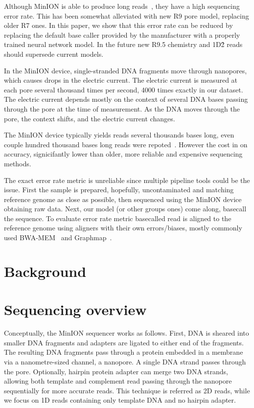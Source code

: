 \documentclass[runningheads,a4paper]{llncs}
\begin{document}
Although MinION is able to produce long reads~\cite{loman1-100k,loman2-800k}, they have a high sequencing error rate. This has been somewhat alleviated with new R9 pore model, replacing older R7 ones. In this paper, we show that this error rate can be reduced by replacing the default base caller provided by the manufacturer with a properly trained neural network model. In the future new R9.5 chemistry and 1D\^2 reads should supersede current models.

In the MinION device, single-stranded DNA fragments move through nanopores, which causes drops in the electric current. The electric current is measured at each pore several thousand times per second, 4000 times exactly in our dataset. The electric current depends mostly on the context of several DNA bases passing through the pore at the time of measurement. As the DNA moves through the pore, the context shifts, and the electric current changes.

The MinION device typically yields reads several thousands bases long, even couple hundred thousand bases long reads were repoted~\cite{loman1-100k,loman2-800k}. However the cost in on accuracy, signicifantly lower than older, more reliable and expensive sequencing methods.

The exact error rate metric is unreliable since multiple pipeline tools could be the issue. First the sample is prepared, hopefully, uncontaminated and matching reference genome as close as possible, then sequenced using the MinION device obtaining raw data. Next, our model (or other groups ones) come along, basecall the sequence. To evaluate error rate metric basecalled read is aligned to the reference genome using aligners with their own errors/biases, mostly commonly used BWA-MEM~\cite{li2013aligning} and Graphmap~\cite{sovic2016fast}.
\section{Background}

\section{Sequencing overview}
Conceptually, the MinION sequencer works as follows. First, DNA is sheared into smaller DNA fragments and adapters are ligated to either end of the fragments. The resulting DNA fragments pass through a protein embedded in a membrane via a nanometre-sized channel, a nanopore. A single DNA strand passes through the pore. Optionally, hairpin protein adapter can merge two DNA strands, allowing both template and complement read passing through the nanopore sequentially for more accurate reads. This technique is referred as 2D reads, while we focus on 1D reads containing only template DNA and no hairpin adapter.
\end{document}
